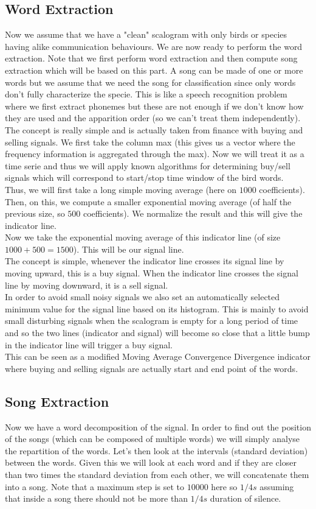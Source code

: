 \documentclass[a4paper]{report}
\begin{document}
\subsection{Word Extraction}
Now we assume that we have a "clean" scalogram with only birds or species having alike communication behaviours. We are now ready to perform the word extraction. Note that we first perform word extraction and then compute song extraction which will be based on this part. A song can be made of one or more words but we assume that we need the song for classification since only words don't fully characterize the specie. This is like a speech recognition problem where we first extract phonemes but these are not enough if we don't know how they are used and the apparition order (so we can't treat them independently).
\\
The concept is really simple and is actually taken from finance with buying and selling signals. We first take the column max (this gives us a vector where the frequency information is aggregated through the max). Now we will treat it as a time serie and thus we will apply known algorithms for determining buy/sell signals which will correspond to start/stop time window of the bird words.\\
Thus, we will first take a long simple moving average (here on $1000$ coefficients). Then, on this, we compute a smaller exponential moving average (of half the previous size, so $500$ coefficients). We normalize the result and this will give the indicator line.
\\
Now we take the exponential moving average of this indicator line (of size $1000+500=1500$). This will be our signal line.
\\
The concept is simple, whenever the indicator line crosses its signal line by moving upward, this is a buy signal. When the indicator line crosses the signal line by moving downward, it is a sell signal.
\\
In order to avoid small noisy signals we also set an automatically selected minimum value for the signal line based on its histogram.
This is mainly to avoid small disturbing signals when the scalogram is empty for a long period of time and so the two lines (indicator and signal) will become so close that a little bump in the indicator line will trigger a buy signal.
\\
This can be seen as a modified Moving Average Convergence Divergence indicator where buying and selling signals are actually start and end point of the words.
\subsection{Song Extraction}
Now we have a word decomposition of the signal. In order to find out the position of the songs (which can be composed of multiple words) we will simply analyse the repartition of the words. Let's then look at the intervals (standard deviation) between the words. Given this we will look at each word and if they are closer than two times the standard deviation from each other, we will concatenate them into a song. Note that a maximum step is set to $10000$ here so $1/4 s$ assuming that inside a song there should not be more than $1/4 s$ duration of silence.
\end{document}
